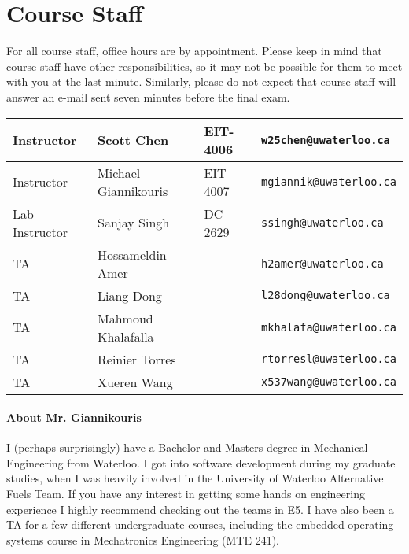 \documentclass[letterpaper,10pt]{article}
\begin{document}
\section*{Course Staff}

For all course staff, office hours are by appointment. Please keep in mind that course staff have other responsibilities, so it may not be possible for them to meet with you at the last minute. Similarly, please do not expect that course staff will answer an e-mail sent seven minutes before the final exam.

\begin{table}[h]
        \begin{center}
        \begin{tabular}{l|l|l|l}
        Instructor & Scott Chen & EIT-4006 & \texttt{w25chen@uwaterloo.ca} \\
        \hline
        Instructor & Michael Giannikouris & EIT-4007 & \texttt{mgiannik@uwaterloo.ca} \\
        \hline
        Lab Instructor & Sanjay Singh & DC-2629 & \texttt{ssingh@uwaterloo.ca}\\
        \hline
        TA & Hossameldin Amer &  & \texttt{h2amer@uwaterloo.ca} \\
        TA & Liang Dong &  & \texttt{l28dong@uwaterloo.ca} \\
        TA & Mahmoud Khalafalla &  & \texttt{mkhalafa@uwaterloo.ca} \\
        TA & Reinier Torres & & \texttt{rtorresl@uwaterloo.ca} \\
        TA & Xueren Wang & & \texttt{x537wang@uwaterloo.ca} \\
        \end{tabular}
        \end{center}
\end{table}


\paragraph{About Mr. Giannikouris}
I (perhaps surprisingly) have a Bachelor and Masters degree in Mechanical Engineering from Waterloo. I got into software development during my graduate studies, when I was heavily involved in the University of Waterloo Alternative Fuels Team. If you have any interest in getting some hands on engineering experience I highly recommend checking out the teams in E5. I have also been a TA for a few different undergraduate courses, including the embedded operating systems course in Mechatronics Engineering (MTE 241).
\end{document}
